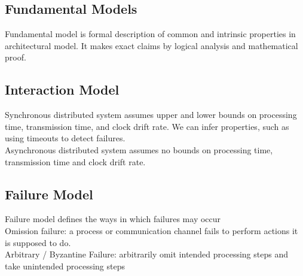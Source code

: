 \begin{multicols*}{2}
\section{Fundamental Models}

\noindent Fundamental model is formal description of common and intrinsic properties in architectural model. It makes exact claims by logical analysis and mathematical proof. 

\subsection{Interaction Model}

\noindent Synchronous distributed system assumes upper and lower bounds on processing time, transmission time, and clock drift rate. We can infer properties, such as using timeouts to detect failures.\\

\noindent Asynchronous distributed system assumes no bounds on processing time, transmission time and clock drift rate. \\

\subsection{Failure Model}

\noindent Failure model defines the ways in which failures may occur \\

\noindent Omission failure: a process or communication channel fails to perform actions it is supposed to do. \\

\noindent Arbitrary / Byzantine Failure: arbitrarily omit intended processing steps and take unintended processing steps \\

\end{multicols*}